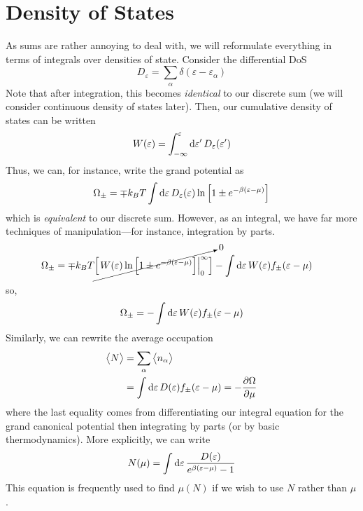 \section{Density of States}
As sums are rather annoying to deal with, we will reformulate everything in terms of integrals over densities of state. Consider the differential DoS 
\begin{equation}
	D_\varepsilon = \sum_\alpha \delta(\varepsilon-\varepsilon_\alpha)
\end{equation}
Note that after integration, this becomes \emph{identical} to our discrete sum (we will consider continuous density of states later). Then, our cumulative density of states can be written
\begin{equation}
	W(\varepsilon) = \int_{-\infty}^\varepsilon \d{\varepsilon'}D_\varepsilon(\varepsilon')
\end{equation}
Thus, we can, for instance, write the grand potential as
\[\Omega_\pm =\mp k_BT\int\d{\varepsilon}D_{\varepsilon}(\varepsilon) \ln \left[1\pm e^{-\beta(\varepsilon-\mu)}\right]\]
which is \emph{equivalent} to our discrete sum. However, as an integral, we have far more techniques of manipulation---for instance, integration by parts.
\begin{align*}
	\Omega_\pm&=\mp k_BT\cancelto{0}{\eval{W(\varepsilon)\ln\left[1\pm e^{-\beta(\varepsilon-\mu)}\right]}{0}{\infty}}-\int\d{\varepsilon}W(\varepsilon)f_\pm(\varepsilon-\mu)
\end{align*}
so,
\begin{equation}
	\Omega_\pm = -\int\d{\varepsilon}W(\varepsilon)f_\pm(\varepsilon-\mu)
\end{equation}
Similarly, we can rewrite the average occupation 
\begin{align*}
	\vect{N}&= \sum_\alpha \vect{n_\alpha}\nonumber\\
		&=\int\d{\varepsilon}D(\varepsilon)f_\pm(\varepsilon-\mu)=-\pder{\Omega}{\mu}
\end{align*}
where the last equality comes from differentiating our integral equation for the grand canonical potential then integrating by parts (or by basic thermodynamics). More explicitly, we can write
\begin{equation}
	N(\mu) = \int\d{\varepsilon}\frac{D(\varepsilon)}{e^{\beta(\varepsilon-\mu)}-1}
\end{equation}
This equation is frequently used to find \(\mu(N)\) if we wish to use \(N\) rather than \(\mu\). 

